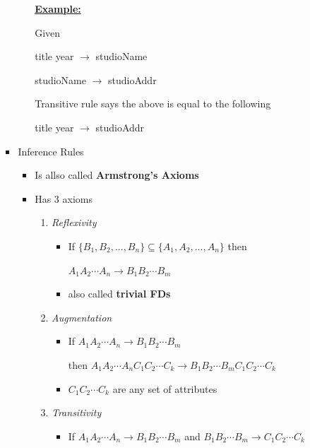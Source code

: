 \documentclass[12pt]{article}
\begin{document}
\begin{enumerate}[1.]
\begin{enumerate}[a)]
\begin{itemize}
\begin{itemize}
                \bigskip

                \underline{\textbf{Example:}}

                \bigskip

                Given

                \bigskip

                title year $\to$ studioName

                studioName $\to$ studioAddr

                \bigskip

                Transitive rule says the above is equal to the following

                \bigskip

                title year $\to$ studioAddr

            \end{itemize}

            \item Inference Rules
            \begin{itemize}
                \item Is allso called \textbf{Armstrong's Axioms}
                \item Has 3 axioms
                \begin{enumerate}[1.]
                    \item \textit{Reflexivity}
                    \begin{itemize}
                        \item If $\{B_1, B_2, ..., B_n\} \subseteq \{A_1, A_2, ..., A_n\}$ then

                        $A_1A_2 \cdots  A_n \to B_1B_2 \cdots B_m$
                        \item also called \textbf{trivial FDs}
                    \end{itemize}
                    \item \textit{Augmentation}
                    \begin{itemize}
                        \item If $A_1A_2 \cdots A_n \to B_1B_2 \cdots B_m$

                        then $A_1A_2 \cdots A_nC_1C_2 \cdots C_k \to B_1B_2 \cdots B_m C_1C_2 \cdots C_k$

                        \item $ C_1C_2 \cdots C_k$ are any set of attributes
                    \end{itemize}
                    \item \textit{Transitivity}
                    \begin{itemize}
                        \item If $A_1A_2 \cdots A_n \to B_1B_2 \cdots B_m$ and $B_1B_2 \cdots B_m \to C_1C_2 \cdots C_k$


\end{itemize}
\end{enumerate}
\end{itemize}
\end{itemize}
\end{enumerate}
\end{enumerate}
\end{document}
